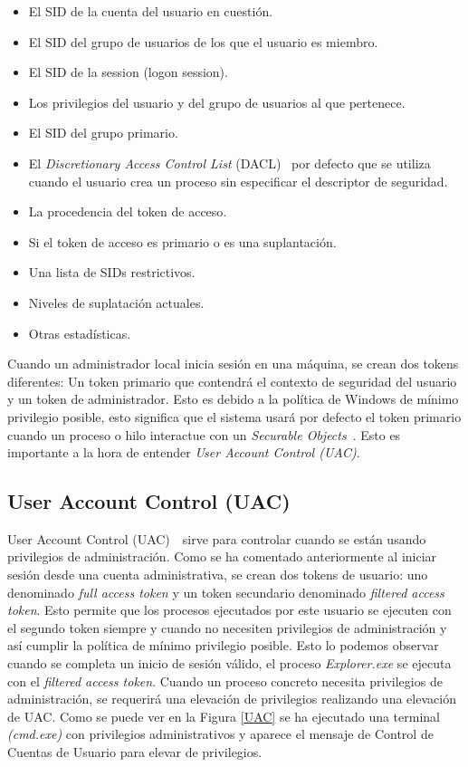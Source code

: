 \begin{itemize}
\item El SID de la cuenta del usuario en cuestión.
\item El SID del grupo de usuarios de los que el usuario es miembro.
\item El SID de la session (logon session).
\item Los privilegios del usuario y del grupo de usuarios al que pertenece.
\item El SID del grupo primario. 
\item El {\it Discretionary Access Control List} (DACL)~\cite{Capitulo2:DACL} por defecto que se utiliza cuando el usuario crea un proceso sin especificar el descriptor de seguridad.
\item La procedencia del token de acceso.
\item Si el token de acceso es primario o es una suplantación. 
\item Una lista de SIDs restrictivos.
\item Niveles de suplatación actuales.
\item Otras estadísticas. 
\end{itemize}

Cuando un administrador local inicia sesión en una máquina, se crean dos tokens diferentes: Un token primario que contendrá el contexto de seguridad del usuario y un token de administrador. Esto es debido a la política de Windows de mínimo privilegio posible, esto significa que el sistema usará por defecto el token primario cuando un proceso o hilo interactue con un {\it Securable Objects}~\cite{Capitulo2:Securable-Objects}. Esto es importante a la hora de entender {\it User Account Control (UAC)}.\\

\subsection{User Account Control (UAC)}

User Account Control (UAC)~\cite{Capitulo2:UAC}~\cite{Capitulo2:UAC2}sirve para controlar cuando se están usando privilegios de administración. Como se ha comentado anteriormente al iniciar sesión desde una cuenta administrativa, se crean dos tokens de usuario: uno denominado {\it full access token} y un token secundario denominado {\it filtered access token}. Esto permite que los procesos ejecutados por este usuario se ejecuten con el segundo token siempre y cuando no necesiten privilegios de administración y así cumplir la política de mínimo privilegio posible. Esto lo podemos observar cuando se completa un inicio de sesión válido, el proceso {\it Explorer.exe} se ejecuta con el {\it filtered access token}. Cuando un proceso concreto necesita privilegios de administración, se requerirá una elevación de privilegios realizando una elevación de UAC. Como se puede ver en la Figura \ref{UAC} se ha ejecutado una terminal {\it (cmd.exe)} con privilegios administrativos y aparece el mensaje de Control de Cuentas de Usuario para elevar de privilegios. \\

